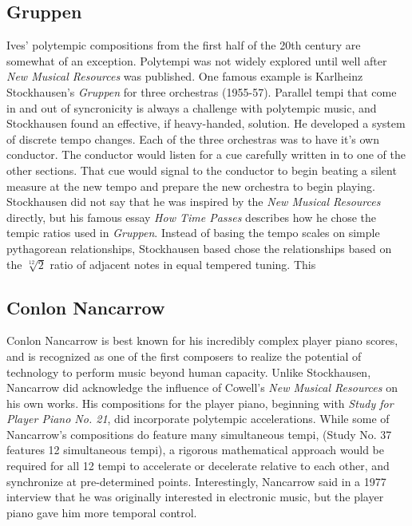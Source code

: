 \subsection{Gruppen}
\label{sec:gruppen}
Ives' polytempic compositions from the first half of the 20th century
are somewhat of an exception. Polytempi was not widely explored until
well after \textit{New Musical Resources} was published. One famous
example is Karlheinz Stockhausen's \textit{Gruppen} for three
orchestras (1955-57). Parallel tempi that come in and out of
syncronicity is always a challenge with polytempic music, and
Stockhausen found an effective, if heavy-handed, solution. He
developed a system of discrete tempo changes. Each of the three
orchestras was to have it's own conductor. The conductor would listen
for a cue carefully written in to one of the other sections. That cue
would signal to the conductor to begin beating a silent measure at the
new tempo and prepare the new orchestra to begin playing.  Stockhausen
did not say that he was inspired by the \textit{New Musical Resources}
directly, but his famous essay \textit{How Time Passes} describes how
he chose the tempic ratios used in \textit{Gruppen}. Instead of basing
the tempo scales on simple pythagorean relationships, Stockhausen
based chose the relationships based on the $\sqrt[12]{2}$ ratio of
adjacent notes in equal tempered tuning. This 


\subsection{Conlon Nancarrow}
\label{sec:conlon-nancarrow}
Conlon Nancarrow is best known for his incredibly complex player piano
scores, and is recognized as one of the first composers to realize the
potential of technology to perform music beyond human capacity. Unlike
Stockhausen, Nancarrow did acknowledge the influence of Cowell's
\textit{New Musical Resources} on his own works. His compositions for
the player piano, beginning with \textit{Study for Player Piano
  No. 21}, did incorporate polytempic
accelerations\cite{Rao2005}. While some of Nancarrow's compositions do
feature many simultaneous tempi, (Study No. 37 features 12
simultaneous tempi)\cite{Greschak2003}, a rigorous mathematical
approach would be required for all 12 tempi to accelerate or
decelerate relative to each other, and synchronize at pre-determined
points. Interestingly, Nancarrow said in a 1977 interview that he was
originally interested in electronic music, but the player piano gave
him more temporal control.\cite{Amirkhanian1977}

